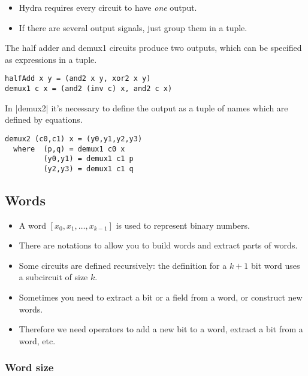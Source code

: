 \documentclass[11pt]{article}
\begin{document}
\begin{itemize}
\item Hydra requires every circuit to have \emph{one} output.
\item If there are several output signals, just group them in a tuple.
\end{itemize}

The half adder and demux1 circuits produce two outputs, which can be
specified as expressions in a tuple.

\begin{verbatim}
halfAdd x y = (and2 x y, xor2 x y)
demux1 c x = (and2 (inv c) x, and2 c x)
\end{verbatim}

In |demux2| it's necessary to define the output as a tuple of names
which are defined by equations.

\begin{verbatim}
demux2 (c0,c1) x = (y0,y1,y2,y3)
  where  (p,q) = demux1 c0 x
         (y0,y1) = demux1 c1 p
         (y2,y3) = demux1 c1 q
\end{verbatim}

\subsection{Words}
\label{sec:orgdd57411}

\begin{itemize}
\item A word \([x_0, x_1, \ldots, x_{k-1}]\) is used to represent
binary numbers.

\item There are notations to allow you to build words and extract
parts of words.

\item Some circuits are defined recursively: the definition for a
\(k+1\) bit word uses a subcircuit of size \(k\).

\item Sometimes you need to extract a bit or a field from a word,
or construct new words.

\item Therefore we need operators to add a new bit to a word,
extract a bit from a word, etc.
\end{itemize}

\subsubsection{Word size}
\label{sec:org636d620}
\end{document}
